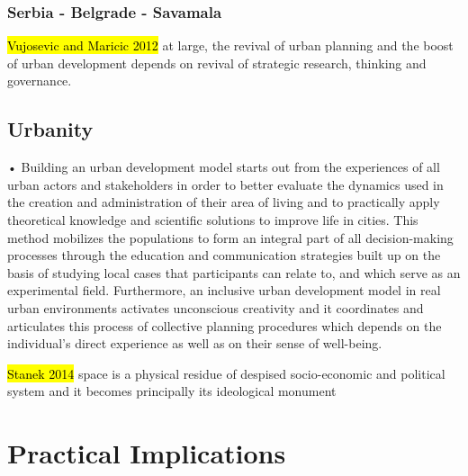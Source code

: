 \documentclass[11pt]{report}
\begin{document}
\subsubsection{Serbia - Belgrade - Savamala}
\hl{Vujosevic and Maricic 2012}
at large, the revival of urban planning and the boost of urban development depends on revival of strategic research, thinking and governance.
    
\subsection{Urbanity}

•	Building an urban development model starts out from the experiences of all urban actors and stakeholders in order to better evaluate the dynamics used in the creation and administration of their area of living and to practically apply theoretical knowledge and scientific solutions to improve life in cities. This method mobilizes the populations to form an integral part of all decision-making processes through the education and communication strategies built up on the basis of studying local cases that participants can relate to, and which serve as an experimental field. Furthermore, an inclusive urban development model in real urban environments activates unconscious creativity and it coordinates and articulates this process of collective planning procedures which depends on the individual's direct experience as well as on their sense of well-being.

\hl{Stanek 2014}
space is a physical residue of despised socio-economic and political system and it becomes principally its ideological monument

\section{Practical Implications}
\end{document}
